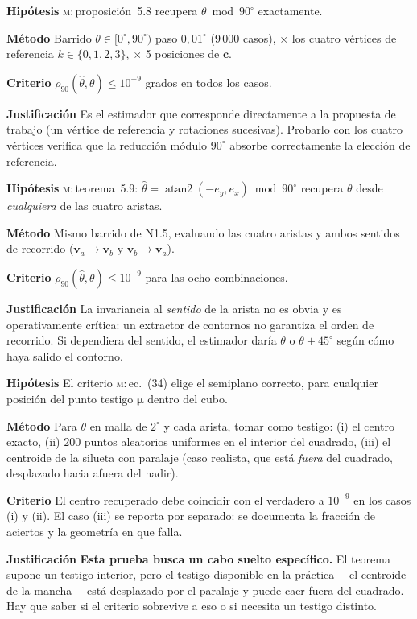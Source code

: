 \documentclass[11pt,a4paper]{article}
\newcommand{\cc}{\mathbf{c}}
\newcommand{\vv}{\mathbf{v}}
\newcommand{\atantwo}{\operatorname{atan2}}
\newcommand{\grados}{^{\circ}}
\newenvironment{prueba}[2]{%
  \par\medskip\noindent
  \begin{tcolorbox}[enhanced,breakable,colback=white,colframe=black!45,
    boxrule=0.5pt,arc=1pt,left=6pt,right=6pt,top=4pt,bottom=4pt,
    title={\bfseries #1\quad\normalfont #2},
    colbacktitle=black!8,coltitle=black,fonttitle=\bfseries\small]
  \small
}{\end{tcolorbox}\par\medskip}
\newcommand{\campo}[1]{\par\smallskip\noindent\textbf{#1}\quad\ignorespaces}
\begin{document}
\begin{prueba}{N1.5}{Estimador B1 --- vértice de referencia y centro}
\campo{Hipótesis} \textsc{m}:\,proposición~5.8 recupera $\theta \bmod 90\grados$ exactamente.
\campo{Método} Barrido $\theta \in [0\grados, 90\grados)$ paso $0{,}01\grados$
(9\,000 casos), $\times$ los cuatro vértices de referencia $k\in\{0,1,2,3\}$,
$\times$ 5 posiciones de $\cc$.
\campo{Criterio} $\rho_{90}(\hat\theta,\theta) \le 10^{-9}$ grados en todos los casos.
\campo{Justificación} Es el estimador que corresponde directamente a la propuesta de
trabajo (un vértice de referencia y rotaciones sucesivas). Probarlo con los cuatro
vértices verifica que la reducción módulo $90\grados$ absorbe correctamente la
elección de referencia.
\end{prueba}

\begin{prueba}{N1.6}{Estimador B2 --- arista}
\campo{Hipótesis} \textsc{m}:\,teorema~5.9: $\hat\theta = \atantwo(-e_y,e_x) \bmod 90\grados$
recupera $\theta$ desde \emph{cualquiera} de las cuatro aristas.
\campo{Método} Mismo barrido de N1.5, evaluando las cuatro aristas y ambos sentidos de
recorrido ($\vv_a\to\vv_b$ y $\vv_b\to\vv_a$).
\campo{Criterio} $\rho_{90}(\hat\theta,\theta)\le 10^{-9}$ para las ocho combinaciones.
\campo{Justificación} La invariancia al \emph{sentido} de la arista no es obvia y es
operativamente crítica: un extractor de contornos no garantiza el orden de recorrido.
Si dependiera del sentido, el estimador daría $\theta$ o $\theta+45\grados$ según cómo
haya salido el contorno.
\end{prueba}

\begin{prueba}{N1.7}{Estimador B2 --- desambiguación del signo de la normal}
\campo{Hipótesis} El criterio \textsc{m}:\,ec.~(34) elige el semiplano correcto, para
cualquier posición del punto testigo $\boldsymbol\mu$ dentro del cubo.
\campo{Método} Para $\theta$ en malla de $2\grados$ y cada arista, tomar como testigo:
(i) el centro exacto, (ii) $200$ puntos aleatorios uniformes en el interior del
cuadrado, (iii) el centroide de la silueta con paralaje (caso realista, que está
\emph{fuera} del cuadrado, desplazado hacia afuera del nadir).
\campo{Criterio} El centro recuperado debe coincidir con el verdadero a $10^{-9}$ en
los casos (i) y (ii). El caso (iii) se reporta por separado: se documenta la fracción
de aciertos y la geometría en que falla.
\campo{Justificación} \textbf{Esta prueba busca un cabo suelto específico.} El teorema
supone un testigo interior, pero el testigo disponible en la práctica ---el centroide
de la mancha--- está desplazado por el paralaje y puede caer fuera del cuadrado. Hay
que saber si el criterio sobrevive a eso o si necesita un testigo distinto.
\end{prueba}
\end{document}
